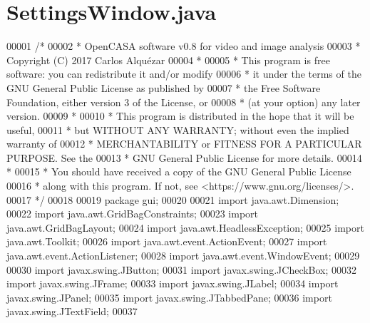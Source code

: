 \hypertarget{_settings_window_8java_source}{}\section{Settings\+Window.\+java}
\label{_settings_window_8java_source}

\begin{DoxyCode}
00001 \textcolor{comment}{/*}
00002 \textcolor{comment}{ *   OpenCASA software v0.8 for video and image analysis}
00003 \textcolor{comment}{ *   Copyright (C) 2017  Carlos Alquézar}
00004 \textcolor{comment}{ *}
00005 \textcolor{comment}{ *   This program is free software: you can redistribute it and/or modify}
00006 \textcolor{comment}{ *   it under the terms of the GNU General Public License as published by}
00007 \textcolor{comment}{ *   the Free Software Foundation, either version 3 of the License, or}
00008 \textcolor{comment}{ *   (at your option) any later version.}
00009 \textcolor{comment}{ *}
00010 \textcolor{comment}{ *   This program is distributed in the hope that it will be useful,}
00011 \textcolor{comment}{ *   but WITHOUT ANY WARRANTY; without even the implied warranty of}
00012 \textcolor{comment}{ *   MERCHANTABILITY or FITNESS FOR A PARTICULAR PURPOSE.  See the}
00013 \textcolor{comment}{ *   GNU General Public License for more details.}
00014 \textcolor{comment}{ *}
00015 \textcolor{comment}{ *   You should have received a copy of the GNU General Public License}
00016 \textcolor{comment}{ *   along with this program.  If not, see <https://www.gnu.org/licenses/>.}
00017 \textcolor{comment}{*/}    
00018 
00019 \textcolor{keyword}{package }gui;
00020 
00021 \textcolor{keyword}{import} java.awt.Dimension;
00022 \textcolor{keyword}{import} java.awt.GridBagConstraints;
00023 \textcolor{keyword}{import} java.awt.GridBagLayout;
00024 \textcolor{keyword}{import} java.awt.HeadlessException;
00025 \textcolor{keyword}{import} java.awt.Toolkit;
00026 \textcolor{keyword}{import} java.awt.event.ActionEvent;
00027 \textcolor{keyword}{import} java.awt.event.ActionListener;
00028 \textcolor{keyword}{import} java.awt.event.WindowEvent;
00029 
00030 \textcolor{keyword}{import} javax.swing.JButton;
00031 \textcolor{keyword}{import} javax.swing.JCheckBox;
00032 \textcolor{keyword}{import} javax.swing.JFrame;
00033 \textcolor{keyword}{import} javax.swing.JLabel;
00034 \textcolor{keyword}{import} javax.swing.JPanel;
00035 \textcolor{keyword}{import} javax.swing.JTabbedPane;
00036 \textcolor{keyword}{import} javax.swing.JTextField;
00037 

\end{DoxyCode}
